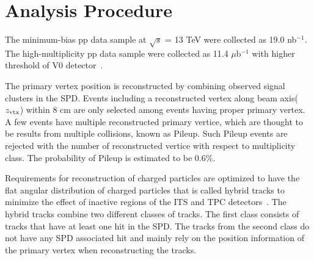 


\section{Analysis Procedure}
\label{sec:ana}

The minimum-bias pp data sample at $\sqrt{s}$ = 13 TeV were collected as 19.0 nb$^{-1}$. The high-multiplicity pp data sample were collected as 11.4 $\mu$b$^{-1}$ with higher threshold of V0 detector~\cite{ALICE-PUBLIC-2016-002}.

The primary vertex position is reconstructed by combining observed signal clusters in the SPD. Events including a reconstructed vertex along beam axis($z_{\rm{vtx}}$) within 8 cm are only selected among events having proper primary vertex. A few events have multiple reconstructed primary vertice, which are thought to be results from multiple collisions, known as Pileup. Such Pileup events are rejected with the number of reconstructed vertice with respect to multiplicity class. The probability of Pileup is estimated to be 0.6\%.

Requirements for reconstruction of charged particles are optimized to have the flat angular distribution of charged particles that is called hybrid tracks to minimize the effect of inactive regions of the ITS and TPC detectors~\cite{hybridExplanation}. 
The hybrid tracks combine two different classes of tracks. The first class consists of tracks that have at least one hit in the SPD. The tracks from the second class do not have any SPD associated hit and mainly rely on the position information of the primary vertex when reconstructing the tracks.

